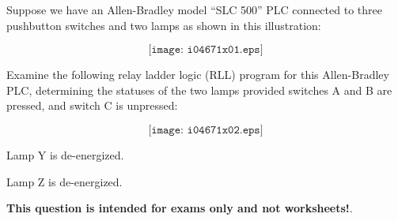 

Suppose we have an Allen-Bradley model ``SLC 500'' PLC connected to three pushbutton switches and two lamps as shown in this illustration:

$$\texttt{[image: i04671x01.eps]}$$

Examine the following relay ladder logic (RLL) program for this Allen-Bradley PLC, determining the statuses of the two lamps provided switches A and B are pressed, and switch C is unpressed:

$$\texttt{[image: i04671x02.eps]}$$







Lamp Y is de-energized.

\vskip 10pt

Lamp Z is de-energized.







{\bf This question is intended for exams only and not worksheets!}.



